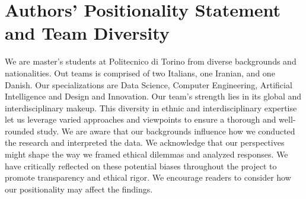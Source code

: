 \section{Authors' Positionality Statement and Team Diversity}

We are master's students at Politecnico di Torino from diverse backgrounds and nationalities.
Out teams is comprised of two Italians, one Iranian, and one Danish.
Our specializations are Data Science, Computer Engineering, Artificial Intelligence and Design and Innovation.
Our team's strength lies in its global and interdisciplinary makeup. This diversity in ethnic and interdisciplinary expertise let us leverage varied approaches and viewpoints to ensure a thorough and well-rounded study.
We are aware that our backgrounds influence how we conducted the research and interpreted the data.
We acknowledge that our perspectives might shape the way we framed ethical dilemmas and analyzed responses.
We have critically reflected on these potential biases throughout the project to promote transparency and ethical rigor.
We encourage readers to consider how our positionality may affect the findings.
